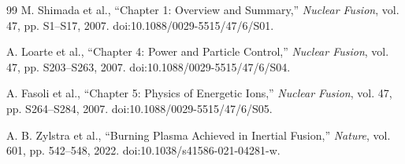 \documentclass[11pt]{article}
\begin{document}
\begin{thebibliography}{99}
M. Shimada et al.,
``Chapter 1: Overview and Summary,''
\emph{Nuclear Fusion}, vol. 47, pp. S1--S17, 2007.
doi:10.1088/0029-5515/47/6/S01.

A. Loarte et al.,
``Chapter 4: Power and Particle Control,''
\emph{Nuclear Fusion}, vol. 47, pp. S203--S263, 2007.
doi:10.1088/0029-5515/47/6/S04.

A. Fasoli et al.,
``Chapter 5: Physics of Energetic Ions,''
\emph{Nuclear Fusion}, vol. 47, pp. S264--S284, 2007.
doi:10.1088/0029-5515/47/6/S05.

A. B. Zylstra et al.,
``Burning Plasma Achieved in Inertial Fusion,''
\emph{Nature}, vol. 601, pp. 542--548, 2022.
doi:10.1038/s41586-021-04281-w.

\end{thebibliography}
\end{document}
